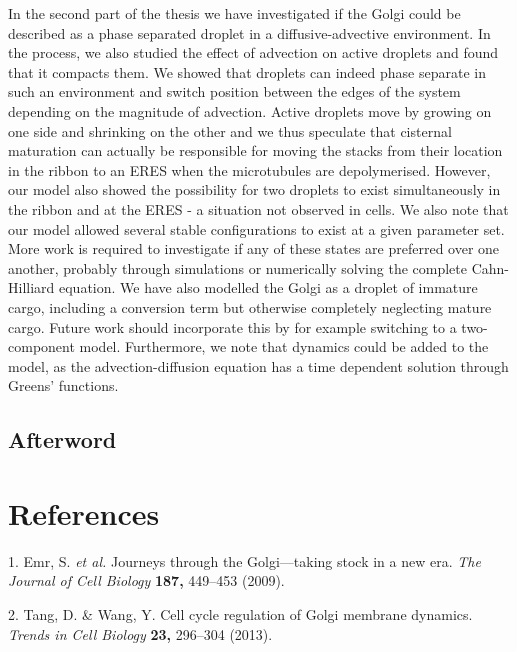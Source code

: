\documentclass{Dissertate}
\begin{document}
In the second part of the thesis we have investigated if the Golgi could be described as a phase separated droplet in a diffusive-advective environment. In the process, we also studied the effect of advection on active droplets and found that it compacts them. We showed that droplets can indeed phase separate in such an environment and switch position between the edges of the system depending on the magnitude of advection. Active droplets move by growing on one side and shrinking on the other and we thus speculate that cisternal maturation can actually be responsible for moving the stacks from their location in the ribbon to an ERES when the microtubules are depolymerised. However, our model also showed the possibility for two droplets to exist simultaneously in the ribbon and at the ERES - a situation not observed in cells. We also note that our model allowed several stable configurations to exist at a given parameter set. More work is required to investigate if any of these states are preferred over one another, probably through simulations or numerically solving the complete Cahn-Hilliard equation. We have also modelled the Golgi as a droplet of immature cargo, including a conversion term but otherwise completely neglecting mature cargo. Future work should incorporate this by for example switching to a two-component model. Furthermore, we note that dynamics could be added to the model, as the advection-diffusion equation has a time dependent solution through Greens' functions. 

\section{Afterword}

\footnotesize

\hypertarget{references}{%
\chapter*{References}\label{references}}

\hypertarget{refs}{}
\leavevmode\hypertarget{ref-emr_journeys_2009}{}%
1. Emr, S. \emph{et al.} Journeys through the Golgi---taking stock in a
new era. \emph{The Journal of Cell Biology} \textbf{187,} 449--453
(2009).

\leavevmode\hypertarget{ref-tang_cell_2013}{}%
2. Tang, D. \& Wang, Y. Cell cycle regulation of Golgi membrane
dynamics. \emph{Trends in Cell Biology} \textbf{23,} 296--304 (2013).
\end{document}
